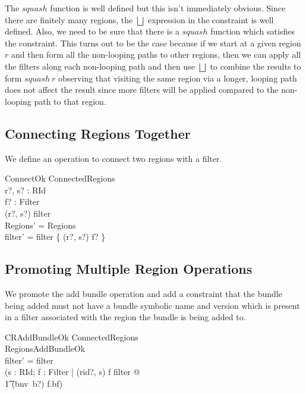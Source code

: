\documentclass[a4paper,9pt]{article}
\begin{document}
The $squash$ function is well defined but this isn't immediately obvious.
Since there are finitely many regions, the $\bigsqcup$ expression in the constraint is well defined.
Also, we need to be sure that there is a $squash$ function which satisfies the constraint.
This turns out to be the case because if we start at a given region $r$ and then form all the non-looping
paths to other regions, then we can apply all the filters along each non-looping path and then
use $\bigsqcup$ to combine the results to form $squash~r$ observing that visiting the same region via
a longer, looping path does not affect the result since more filters will
be applied compared to the non-looping path to that region.

\subsection{Connecting Regions Together}

We define an operation to connect two regions with a filter.
\begin{schema}{ConnectOk}
  \Delta ConnectedRegions \\
  r?, s? : RId \\
  f? : Filter \\
\where
  (r?, s?) \notin \dom filter \\
  \theta Regions' = \theta Regions \\
  filter' = filter \cup \{ (r?, s?) \mapsto f? \} \\
\end{schema}

\subsection{Promoting Multiple Region Operations}

We promote the add bundle operation and add a constraint that the bundle being added must not 
have a bundle symbolic name and version which is present in a filter associated with the region
the bundle is being added to.
\begin{schema}{CRAddBundleOk}
  \Delta ConnectedRegions \\
  RegionsAddBundleOk \\
\where
  filter' = filter \\
  (\forall s : RId; f : Filter | (rid?, s) \mapsto f \in filter @ \\
\t1 (bnv~b?) \notin f.bf) \\ 
\end{schema}
\end{document}
